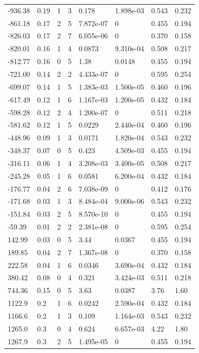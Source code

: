 \documentclass[preview]{standalone}
\begin{document}
{{\begin{tabular}{L{1.2cm}C{1.2cm} C{0.3cm}C{0.5cm} C{1.4cm}C{1.4cm} C{1.4cm}C{1.4cm}}
  -936.38  &  0.19  & 1     &  3 &  0.178  & 1.898e-03  & 0.543 &  0.232   \\ 
  -861.18  &  0.17  & 2     &  5 &  7.872e-07  & 0  & 0.455 &  0.194   \\ 
  -826.03  &  0.17  & 2     &  7 &  6.055e-06  & 0  & 0.370 &  0.158   \\ 
  -820.01  &  0.16  & 1     &  4 &  0.0873  & 9.310e-04  & 0.508 &  0.217   \\ 
  -812.77  &  0.16  & 0     &  5 &  1.38  & 0.0148  & 0.455 &  0.194   \\ 
  -721.00  &  0.14  & 2     &  2 &  4.433e-07  & 0  & 0.595 &  0.254   \\ 
  -699.07  &  0.14  & 1     &  5 &  1.383e-03  & 1.500e-05  & 0.460 &  0.196   \\ 
  -617.49  &  0.12  & 1     &  6 &  1.167e-03  & 1.200e-05  & 0.432 &  0.184   \\ 
  -598.28  &  0.12  & 2     &  4 &  1.200e-07  & 0  & 0.511 &  0.218   \\ 
  -581.62  &  0.12  & 1     &  5 &  0.0229  & 2.440e-04  & 0.460 &  0.196   \\ 
  -448.96  &  0.09  & 1     &  3 &  0.0171  & 1.820e-04  & 0.543 &  0.232   \\ 
  -348.37  &  0.07  & 0     &  5 &  0.423  & 4.509e-03  & 0.455 &  0.194   \\ 
  -316.11  &  0.06  & 1     &  4 &  3.208e-03  & 3.400e-05  & 0.508 &  0.217   \\ 
  -245.28  &  0.05  & 1     &  6 &  0.0581  & 6.200e-04  & 0.432 &  0.184   \\ 
  -176.77  &  0.04  & 2     &  6 &  7.038e-09  & 0  & 0.412 &  0.176   \\ 
  -171.68  &  0.03  & 1     &  3 &  8.484e-04  & 9.000e-06  & 0.543 &  0.232   \\ 
  -151.84  &  0.03  & 2     &  5 &  8.570e-10  & 0  & 0.455 &  0.194   \\ 
  -59.39  &  0.01  & 2     &  2 &  2.381e-08  & 0  & 0.595 &  0.254   \\ 
  142.99  &  0.03  & 0     &  5 &  3.44  & 0.0367  & 0.455 &  0.194   \\ 
  189.85  &  0.04  & 2     &  7 &  1.367e-08  & 0  & 0.370 &  0.158   \\ 
  222.58  &  0.04  & 1     &  6 &  0.0346  & 3.690e-04  & 0.432 &  0.184   \\ 
  380.42  &  0.08  & 0     &  4 &  0.321  & 3.424e-03  & 0.511 &  0.218   \\ 
  744.36  &  0.15  & 0     &  5 &  3.63  & 0.0387  & 3.76 &  1.60   \\ 
  1122.9  &   0.2  & 1     &  6 &  0.0242  & 2.590e-04  & 0.432 &  0.184   \\ 
  1166.6  &   0.2  & 1     &  3 &  0.109  & 1.164e-03  & 0.543 &  0.232   \\ 
  1265.0  &   0.3  & 0     &  4 &  0.624  & 6.657e-03  & 4.22 &  1.80   \\ 
  1267.9  &   0.3  & 2     &  5 &  1.495e-05  & 0  & 0.455 &  0.194   \\ 
\hline 
\end{tabular} 

}}
\end{document}
